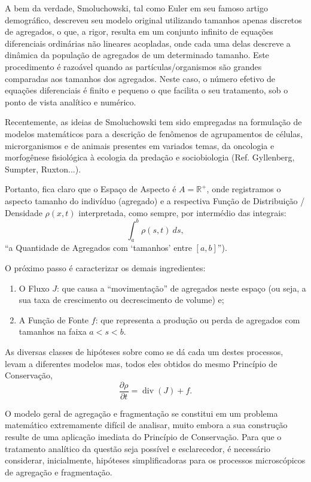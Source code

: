 A bem da verdade, Smoluchowski, tal como Euler em seu famoso artigo demográfico, descreveu seu modelo original utilizando tamanhos apenas discretos de agregados, o que, a rigor, resulta em um conjunto infinito de equações diferenciais ordinárias não lineares acopladas, onde cada uma delas descreve a dinâmica da população de agregados de um determinado tamanho. Este procedimento é razoável quando as partículas/organismos são grandes comparadas aos tamanhos dos agregados. Neste caso, o número efetivo de equações diferenciais é finito e pequeno o que facilita o seu tratamento, sob o ponto de vista analítico e numérico.

Recentemente, as ideias de Smoluchowski tem sido empregadas na formulação de modelos matemáticos para a descrição de fenômenos de agrupamentos de células, microrganismos e de animais presentes em variados temas, da oncologia e morfogênese fisiológica à ecologia da predação e sociobiologia (Ref. Gyllenberg, Sumpter, Ruxton...).

Portanto, fica claro que o Espaço de Aspecto é \(A = \mathbb{R}^+\), onde registramos o aspecto tamanho do indivíduo (agregado) e a respectiva Função de Distribuição / Densidade \(\rho(x,t)\) interpretada, como sempre, por intermédio das integrais: 
\[\displaystyle\int_{a}^{b} \rho(s,t)\ ds,\]
``a Quantidade de Agregados com `tamanhos' entre \([a, b]\)'').

O próximo passo é caracterizar os demais ingredientes:

\begin{enumerate}
\item O Fluxo \(J\): que causa a ``movimentação'' de agregados neste espaço (ou seja, a sua taxa de crescimento ou decrescimento de volume) e;

\item A Função de Fonte \(f\): que representa a produção ou perda de agregados com tamanhos na faixa \(a < s < b\).
\end{enumerate}

As diversas classes de hipóteses sobre como se dá cada um destes processos, levam a diferentes modelos mas, todos eles obtidos do mesmo Princípio de Conservação,
\[\dfrac{\partial \rho}{\partial t} = \operatorname{div}(J) + f.\]  

O modelo geral de agregação e fragmentação se constitui em um problema matemático extremamente difícil de analisar, muito embora a sua construção resulte de uma aplicação imediata do Princípio de Conservação. Para que o tratamento analítico da questão seja possível e esclarecedor, é necessário considerar, inicialmente, hipóteses simplificadoras para os processos microscópicos de agregação e fragmentação.

